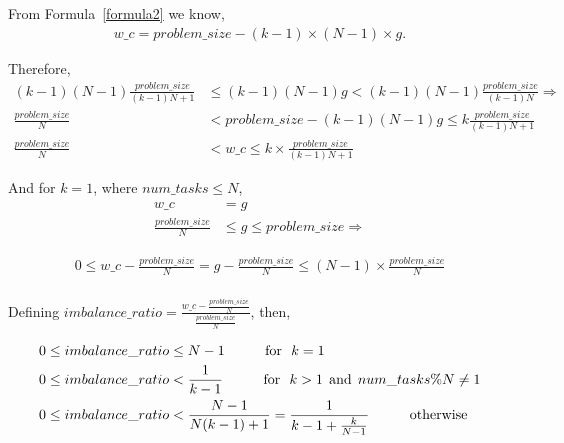 From Formula~\ref{formula2} we know,
\begin{equation}\label{formula17}
\begin{aligned}
w\_c={problem\_{size}}-(k-1)\times(N-1)\times{g}.
\end{aligned}
\end{equation}

Therefore,
\begin{equation}\label{formula18}
\begin{aligned}
(k-1)(N-1)\frac{problem\_{size}}{(k-1){N}+1}&\leq{(k-1)(N-1){g}}<(k-1)(N-1)\frac{problem\_{size}}{(k-1){N}}\Rightarrow\\
{\frac{problem\_{size}}{N}}&<{problem\_{size}-{(k-1)(N-1){g}}}\leq{k\frac{problem\_{size}}{(k-1){N}+1}}\\
{\frac{problem\_{size}}{N}}&<{w\_{c}}\leq{k\times\frac{problem\_{size}}{(k-1){N}+1}}
\end{aligned}
\end{equation}

And for $k=1$, where $num\_{tasks}\leq{N}$,
\begin{align*}\label{formula12}
w\_c&=g\\
\frac{problem\_{size}}{N}&\leq{g}\leq{problem\_{size}}\Rightarrow
\end{align*}

\begin{equation}\label{formula14}
\begin{aligned}
0\leq{w\_c-\frac{problem\_{size}}{N}}={g-\frac{problem\_{size}}{N}}\leq(N-1)\times{\frac{problem\_{size}}{N}}\\
\end{aligned}
\end{equation}


Defining $imbalance\_{ratio}=\frac{w\_c-\frac{problem\_{size}}{N}}{\frac{problem\_{size}}{N}}$, then,

\begin{equation}\label{formula13}
\begin{aligned}
0&\leq{imbalance\_{ratio}}\leq{N-1}  \text{\:\:\:\:\:\:\:\:\:\:\:\:\:for\:\:\:}k={1}\\
0&\leq{imbalance\_{ratio}}<\frac{1}{k-1}  \text{\:\:\:\:\:\:\:\:\:\:\:\:\:for\:\:\:}k>{1} \text{\:\:and\:\:}num\_{tasks}\%{N}\neq{1}\\
0&\leq{imbalance\_{ratio}}<\frac{N-1}{N(k-1)+1}=\frac{1}{k-1+\frac{k}{N-1}}\text{\:\:\:\:\:\:\:\:\:\:\:\:\:otherwise}
\end{aligned}
\end{equation}

